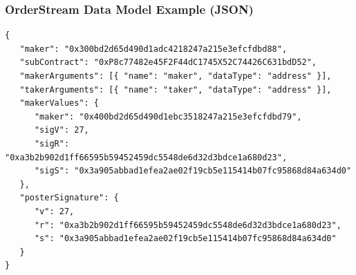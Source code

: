 \documentclass[9pt]{article}
\begin{document}
\subsubsection{OrderStream Data Model Example (JSON)}
\begin{lstlisting}
{
   "maker": "0x300bd2d65d490d1adc4218247a215e3efcfdbd88",
   "subContract": "0xP8c77482e45F2F44dC1745X52C74426C631bdD52",
   "makerArguments": [{ "name": "maker", "dataType": "address" }],
   "takerArguments": [{ "name": "taker", "dataType": "address" }],
   "makerValues": {
      "maker": "0x400bd2d65d490d1ebc3518247a215e3efcfdbd79",
      "sigV": 27,
      "sigR": "0xa3b2b902d1ff66595b59452459dc5548de6d32d3bdce1a680d23",
      "sigS": "0x3a905abbad1efea2ae02f19cb5e115414b07fc95868d84a634d0"
   },
   "posterSignature": {
      "v": 27,
      "r": "0xa3b2b902d1ff66595b59452459dc5548de6d32d3bdce1a680d23",
      "s": "0x3a905abbad1efea2ae02f19cb5e115414b07fc95868d84a634d0"
   }
}
\end{lstlisting} 

\clearpage
\pagebreak
\end{document}
